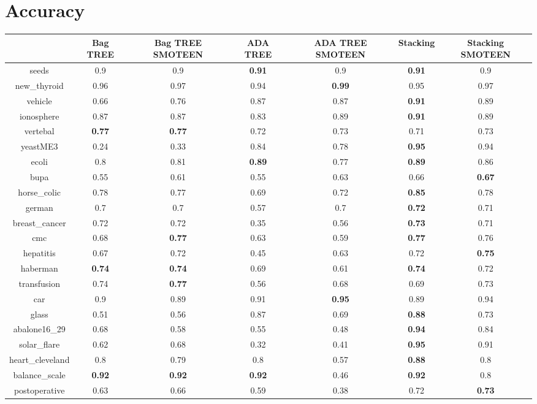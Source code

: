 \documentclass{article}%
\begin{document}
%
\normalsize%
\section*{Accuracy}%
\begin{tabular}{c|cccccc}%
&Bag TREE&Bag TREE SMOTEEN&ADA TREE&ADA TREE SMOTEEN&Stacking&Stacking SMOTEEN\\%
\hline%
seeds&0.9&0.9&\textbf{0.91}&0.9&\textbf{0.91}&0.9\\%
new\_thyroid&0.96&0.97&0.94&\textbf{0.99}&0.95&0.97\\%
vehicle&0.66&0.76&0.87&0.87&\textbf{0.91}&0.89\\%
ionosphere&0.87&0.87&0.83&0.89&\textbf{0.91}&0.89\\%
vertebal&\textbf{0.77}&\textbf{0.77}&0.72&0.73&0.71&0.73\\%
yeastME3&0.24&0.33&0.84&0.78&\textbf{0.95}&0.94\\%
ecoli&0.8&0.81&\textbf{0.89}&0.77&\textbf{0.89}&0.86\\%
bupa&0.55&0.61&0.55&0.63&0.66&\textbf{0.67}\\%
horse\_colic&0.78&0.77&0.69&0.72&\textbf{0.85}&0.78\\%
german&0.7&0.7&0.57&0.7&\textbf{0.72}&0.71\\%
breast\_cancer&0.72&0.72&0.35&0.56&\textbf{0.73}&0.71\\%
cmc&0.68&\textbf{0.77}&0.63&0.59&\textbf{0.77}&0.76\\%
hepatitis&0.67&0.72&0.45&0.63&0.72&\textbf{0.75}\\%
haberman&\textbf{0.74}&\textbf{0.74}&0.69&0.61&\textbf{0.74}&0.72\\%
transfusion&0.74&\textbf{0.77}&0.56&0.68&0.69&0.73\\%
car&0.9&0.89&0.91&\textbf{0.95}&0.89&0.94\\%
glass&0.51&0.56&0.87&0.69&\textbf{0.88}&0.73\\%
abalone16\_29&0.68&0.58&0.55&0.48&\textbf{0.94}&0.84\\%
solar\_flare&0.62&0.68&0.32&0.41&\textbf{0.95}&0.91\\%
heart\_cleveland&0.8&0.79&0.8&0.57&\textbf{0.88}&0.8\\%
balance\_scale&\textbf{0.92}&\textbf{0.92}&\textbf{0.92}&0.46&\textbf{0.92}&0.8\\%
postoperative&0.63&0.66&0.59&0.38&0.72&\textbf{0.73}\\%
\end{tabular}

%
\end{document}
